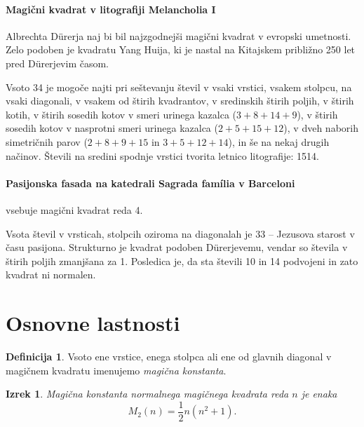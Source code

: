 \documentclass[a4paper,12pt]{article}
\theoremstyle{definition}
\newtheorem{definicija}{Definicija}
\theoremstyle{plain}
\newtheorem{izrek}{Izrek}
\begin{document}
\paragraph{Magični kvadrat v litografiji Melancholia I}
Albrechta Dürerja naj bi bil najzgodnejši magični kvadrat
v evropski umetnosti. Zelo podoben je kvadratu Yang Huija, ki je nastal na Kitajskem
približno 250 let pred Dürerjevim časom.

Vsoto 34 je mogoče najti pri seštevanju števil v vsaki vrstici, vsakem stolpcu,
na vsaki diagonali, v vsakem od štirih kvadrantov, v sredinskih štirih poljih,
v štirih kotih, v štirih sosedih kotov v smeri urinega kazalca (\(3+8+14+9\)), v
štirih sosedih kotov v nasprotni smeri urinega kazalca (\(2+5+15+12\)), v dveh naborih
simetričnih parov (\(2+8+9+15\) in \(3+5+12+14\)), in še na nekaj drugih načinov.
Števili na sredini spodnje vrstici tvorita letnico litografije: 1514.

\paragraph{Pasijonska fasada na katedrali Sagrada família v Barceloni}
vsebuje magični kvadrat reda 4.

Vsota števil v vrsticah, stolpcih oziroma na diagonalah je 33 -- Jezusova starost
v času pasijona. Strukturno je kvadrat podoben Dürerjevemu, vendar so števila
v štirih poljih zmanjšana za 1. Posledica je, da sta števili 10 in 14 podvojeni
in zato kvadrat ni normalen.


\section{Osnovne lastnosti}

 \begin{definicija}
      Vsoto ene vrstice, enega stolpca ali ene od glavnih diagonal
      v magičnem kvadratu imenujemo \emph{magična konstanta}.
 \end{definicija}

\begin{izrek}
   Magična konstanta normalnega magičnega kvadrata reda \(n\)
   je enaka
   \begin{equation}
       \label{eq:mc}
         M_2(n) = \frac{1}{2}n(n^2+1).
   \end{equation}
\end{izrek}
\end{document}
